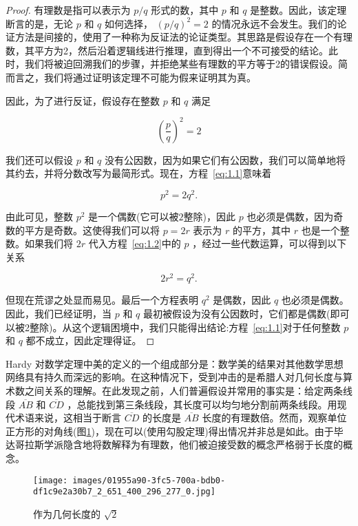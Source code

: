 \begin{proof}
有理数是指可以表示为 \(p/q\) 形式的数，其中 \(p\) 和 \(q\) 是整数。因此，该定理断言的是，无论 \(p\) 和 \(q\) 如何选择， \({\left( p/q\right) }^{2} = 2\) 的情况永远不会发生。我们的论证方法是间接的，使用了一种称为反证法的论证类型。其思路是假设存在一个有理数，其平方为2，然后沿着逻辑线进行推理，直到得出一个不可接受的结论。此时，我们将被迫回溯我们的步骤，并拒绝某些有理数的平方等于2的错误假设。简而言之，我们将通过证明该定理不可能为假来证明其为真。

因此，为了进行反证，假设存在整数 \(p\) 和 \(q\) 满足

\begin{equation}
\label{eq:1.1}
{\left( \frac{p}{q}\right) }^{2} = 2
\end{equation}

我们还可以假设 \(p\) 和 \(q\) 没有公因数，因为如果它们有公因数，我们可以简单地将其约去，并将分数改写为最简形式。现在，方程~\eqref{eq:1.1}意味着

\begin{equation}
\label{eq:1.2}
{p}^{2} = 2{q}^{2}.
\end{equation}

由此可见，整数 \({p}^{2}\) 是一个偶数(它可以被$2$整除)，因此 \(p\) 也必须是偶数，因为奇数的平方是奇数。这使得我们可以将 \(p = {2r}\) 表示为 \(r\) 的平方，其中 \(r\) 也是一个整数。如果我们将 \({2r}\) 代入方程~\eqref{eq:1.2}中的 \(p\) ，经过一些代数运算，可以得到以下关系

\[
2{r}^{2} = {q}^{2}.
\]

但现在荒谬之处显而易见。最后一个方程表明 \({q}^{2}\) 是偶数，因此 \(q\) 也必须是偶数。因此，我们已经证明，当 \(p\) 和 \(q\) 最初被假设为没有公因数时，它们都是偶数(即可以被2整除)。从这个逻辑困境中，我们只能得出结论:方程~\eqref{eq:1.1}对于任何整数 \(p\) 和 \(q\) 都不成立，因此定理得证。  
\end{proof}

Hardy 对数学定理中美的定义的一个组成部分是：数学美的结果对其他数学思想网络具有持久而深远的影响。在这种情况下，受到冲击的是希腊人对几何长度与算术数之间关系的理解。在此发现之前，人们普遍假设并常用的事实是：给定两条线段 \(\overline{AB}\) 和 \(\overline{CD}\) ，总能找到第三条线段，其长度可以均匀地分割前两条线段。用现代术语来说，这相当于断言 \(\overline{CD}\) 的长度是 \(\overline{AB}\) 长度的有理数倍。然而，观察单位正方形的对角线(图\ref{fig:1.1})，现在可以(使用勾股定理)得出情况并非总是如此。由于毕达哥拉斯学派隐含地将数解释为有理数，他们被迫接受数的概念严格弱于长度的概念。

\begin{figure}[h]
  \centering
  \texttt{[image: images/01955a90-3fc5-700a-bdb0-df1c9e2a30b7\_2\_651\_400\_296\_277\_0.jpg]}
  \caption{作为几何长度的 \(\sqrt{2}\)}
  \label{fig:1.1}
\end{figure}

